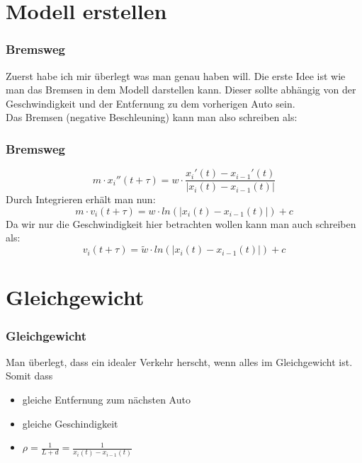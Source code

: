 \documentclass{beamer}
\begin{document}
\section{Modell erstellen}


\begin{frame}
\frametitle{Bremsweg}
Zuerst habe ich mir überlegt was man genau haben will. Die erste Idee ist wie man das Bremsen in dem Modell darstellen kann. Dieser sollte abhängig von der Geschwindigkeit und der Entfernung zu dem vorherigen Auto sein.\\
Das Bremsen (negative Beschleuning) kann man also schreiben als:
\end{frame}

\begin{frame}
\frametitle{Bremsweg}
$$m \cdot x_i''(t+\tau)=w \cdot \frac{x_i'(t)-x_{i-1}'(t)}{|x_i(t)-x_{i-1}(t)|}$$
Durch Integrieren erhält man nun:
$$m \cdot v_i(t+\tau)=w \cdot ln(|x_i(t)-x_{i-1}(t)|) + c$$
Da wir nur die Geschwindigkeit hier betrachten wollen kann man auch schreiben als:
$$v_i(t+\tau)=\widetilde{w} \cdot ln(|x_i(t)-x_{i-1}(t)|) + c$$
\end{frame}


\section{Gleichgewicht}

\begin{frame}
\frametitle{Gleichgewicht}

Man überlegt, dass ein idealer Verkehr herscht, wenn alles im Gleichgewicht ist.
Somit dass
\begin{itemize}
    \item gleiche Entfernung zum nächsten Auto
    \item gleiche Geschindigkeit
    \item<2-> $\rho = \frac{1}{L+d}=\frac{1}{x_i(t)-x_{i-1}(t)}$
\end{itemize}
\end{frame}
\end{document}
